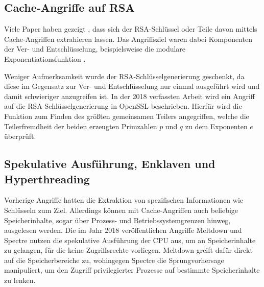 \subsection{Cache-Angriffe auf RSA}

Viele Paper haben gezeigt \cite{CacheBleedOpenSSLRSA, FlushReload, DriveByPaper}, dass sich der RSA-Schlüssel oder Teile davon mittels Cache-Angriffen extrahieren lassen. Das Angriffsziel waren dabei Komponenten der Ver- und Entschlüsselung, beispielsweise die modulare Exponentiationsfunktion \cite{CacheBleedOpenSSLRSA, DriveByPaper, DriveByPaper}. 


Weniger Aufmerksamkeit wurde der RSA-Schlüsselgenerierung geschenkt, da diese im Gegensatz zur Ver- und Entschlüsselung nur einmal ausgeführt wird und damit schwieriger anzugreifen ist.
In der 2018 verfassten Arbeit \cite{RSAKeyGeneration2} wird ein Angriff auf die RSA-Schlüsselgenerierung in OpenSSL beschrieben.
Hierfür wird die Funktion zum Finden des größten gemeinsamen Teilers angegriffen, welche die Teilerfremdheit der beiden erzeugten Primzahlen $p$ und $q$ zu dem Exponenten $e$ überprüft.



\subsection{Spekulative Ausführung, Enklaven und Hyperthreading}
\label{relatedWorkHyperthreading}


Vorherige Angriffe hatten die Extraktion von spezifischen Informationen wie Schlüsseln zum Ziel. Allerdings können mit Cache-Angriffen auch beliebige Speicherinhalte, sogar über Prozess- und Betriebssystemgrenzen hinweg, ausgelesen werden.
Die im Jahr 2018 veröffentlichen Angriffe Meltdown \cite{MeltdownPaper} und Spectre \cite{SpectrePaper} nutzen die spekulative Ausführung der CPU aus, um an Speicherinhalte zu gelangen, für die keine Zugriffsrechte vorliegen.
Meltdown greift dafür direkt auf die Speicherbereiche zu, wohingegen Spectre die Sprungvorhersage manipuliert, um den Zugriff privilegierter Prozesse auf bestimmte Speicherinhalte zu lenken.

